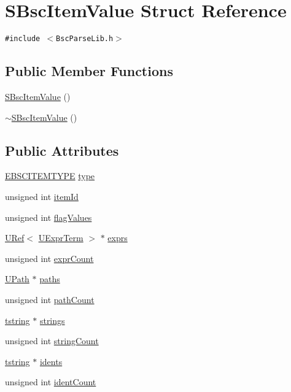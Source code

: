 \hypertarget{struct_s_bsc_item_value}{
\section{SBscItemValue Struct Reference}
\label{struct_s_bsc_item_value}
}
{\tt \#include $<$BscParseLib.h$>$}

\subsection*{Public Member Functions}
\begin{CompactItemize}
\item 
\hyperlink{struct_s_bsc_item_value_1058915d16fe62a8b464cf3c9dbc3b8b}{SBscItemValue} ()
\item 
\hyperlink{struct_s_bsc_item_value_9997da334a63ae0a0181b65bee5ec0d9}{$\sim$SBscItemValue} ()
\end{CompactItemize}
\subsection*{Public Attributes}
\begin{CompactItemize}
\item 
\hyperlink{_bsc_parse_lib_8h_7321d18d9bef2ff4ce8a9b26574f4a53}{EBSCITEMTYPE} \hyperlink{struct_s_bsc_item_value_87ed28e13fc40257fc07fdfcaa81d39a}{type}
\item 
unsigned int \hyperlink{struct_s_bsc_item_value_2e453ac03f7a690ef1350e7f3f8e97cc}{itemId}
\item 
unsigned int \hyperlink{struct_s_bsc_item_value_ced6e9051d3dcdf6d0aa6c56e90b1aff}{flagValues}
\item 
\hyperlink{class_u_ref}{URef}$<$ \hyperlink{class_u_expr_term}{UExprTerm} $>$ $\ast$ \hyperlink{struct_s_bsc_item_value_41b187a9f9498a0897dd15e3e436dd09}{exprs}
\item 
unsigned int \hyperlink{struct_s_bsc_item_value_ba6f143883b5a9315fe42900e3b20c38}{exprCount}
\item 
\hyperlink{class_u_path}{UPath} $\ast$ \hyperlink{struct_s_bsc_item_value_cff0f8cfb02c49a620a63d19c7d9090e}{paths}
\item 
unsigned int \hyperlink{struct_s_bsc_item_value_e2e775d9f815602fac6609d1e7c54dd9}{pathCount}
\item 
\hyperlink{common__afx_8h_816fa58fd77499b0edb2c69ebe803d5c}{tstring} $\ast$ \hyperlink{struct_s_bsc_item_value_0d3b6e99f40432b484d8e653b2afd127}{strings}
\item 
unsigned int \hyperlink{struct_s_bsc_item_value_152bb01d2020b1559b77f008e8cf7f91}{stringCount}
\item 
\hyperlink{common__afx_8h_816fa58fd77499b0edb2c69ebe803d5c}{tstring} $\ast$ \hyperlink{struct_s_bsc_item_value_5484a3895096610e2adee2ed158f9184}{idents}
\item 
unsigned int \hyperlink{struct_s_bsc_item_value_561bad8d70319d99bb4db636af6b1336}{identCount}
\end{CompactItemize}


